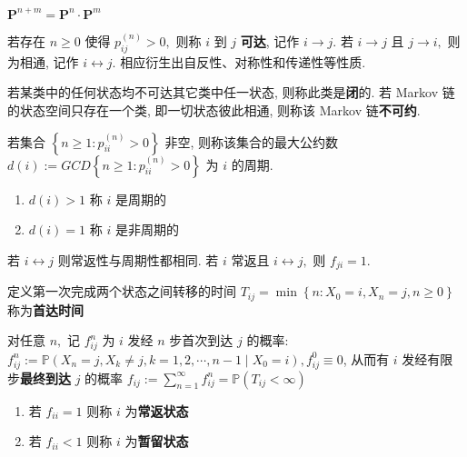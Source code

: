\documentclass[10pt]{yerbaformat}
\begin{document}
\begin{theorem}
    $\mathbf{P}^{n+m}=\mathbf{P}^{n} \cdot \mathbf{P}^{m}$
\end{theorem}

\begin{definition}[可达]
    若存在 $n \geq 0$ 使得 $p_{i j}^{(n)}>0,$ 则称 $i$ 到 $j$ \textbf{可达}, 记作 $i \rightarrow j .$ 若 $i \rightarrow j$ 且 $j \rightarrow i,$ 则为相通, 记作 $i \leftrightarrow j$. 相应衍生出自反性、对称性和传递性等性质.
\end{definition}

\begin{definition}[可约]
    若某类中的任何状态均不可达其它类中任一状态, 则称此类是\textbf{闭}的. 若 Markov 链的状态空间只存在一个类, 即一切状态彼此相通, 则称该 Markov 链\textbf{不可约}.
\end{definition}

\begin{definition}[周期]
    若集合 $\left\{n \geq 1: p_{i i}^{(n)}>0\right\}$ 非空, 则称该集合的最大公约数 $d(i):=G C D\left\{n \geq 1: p_{i i}^{(n)}>0\right\}$ 为 $i$ 的周期. 
    \begin{enumerate}
        \item $d(i)>1$ 称 $i$ 是周期的
        \item $d(i)=1$ 称 $i$ 是非周期的
    \end{enumerate}
\end{definition}

\begin{lemma}
    若 $i \leftrightarrow j$ 则常返性与周期性都相同. 若 $i$ 常返且 $i \leftrightarrow j,$ 则 $f_{j i}=1 .$
\end{lemma}

\begin{definition}[首达时间]
    定义第一次完成两个状态之间转移的时间 $T_{i j}=\min \left\{n: X_{0}=i, X_{n}=j, n \geq 0\right\}$ 称为\textbf{首达时间} %
\end{definition}

\begin{definition}
    对任意 $n,$ 记 $f_{i j}^{n}$ 为 $i$ 发经 $n$ 步首次到达 $j$ 的概率: $f_{i j}^{n}:=\mathbb{P}\left(X_{n}=j, X_{k} \neq j, k=1,2, \cdots, n-1 \mid X_{0}=i\right), f_{i j}^{0} \equiv 0 $, 从而有 $i$ 发经有限步\textbf{最终到达} $j$ 的概率 $f_{i j}:=\sum_{n=1}^{\infty} f_{i j}^{n}=\mathbb{P}\left(T_{i j}<\infty\right)$
    \begin{enumerate}
        \item 若 $f_{i i}=1$ 则称 $i$ 为\textbf{常返状态}
        \item 若 $f_{i i}<1$ 则称 $i$ 为\textbf{暂留状态}
    \end{enumerate}
\end{definition}
\end{document}
